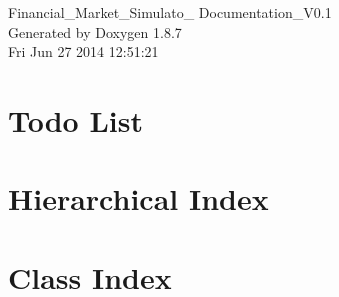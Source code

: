 \documentclass[twoside]{book}
\newcommand{\+}{\discretionary{\mbox{\scriptsize$\hookleftarrow$}}{}{}}
\newcommand{\clearemptydoublepage}{%
  \newpage{\pagestyle{empty}\cleardoublepage}%
}
\begin{document}
\hypersetup{pageanchor=false,
             bookmarks=true,
             bookmarksnumbered=true,
             pdfencoding=unicode
            }
\begin{titlepage}
\vspace*{7cm}
\begin{center}%
{\Large Financial\+\_\+\+Market\+\_\+\+Simulato\+\_\+ Documentation\+\_\+\+V0.1 }\\
\vspace*{1cm}
{\large Generated by Doxygen 1.8.7}\\
\vspace*{0.5cm}
{\small Fri Jun 27 2014 12:51:21}\\
\end{center}
\end{titlepage}
\clearemptydoublepage
\tableofcontents
\clearemptydoublepage
{}
\hypersetup{pageanchor=true}

\chapter{Todo List}
\label{todo}
\hypertarget{todo}{}

\chapter{Hierarchical Index}

\chapter{Class Index}

\end{document}
